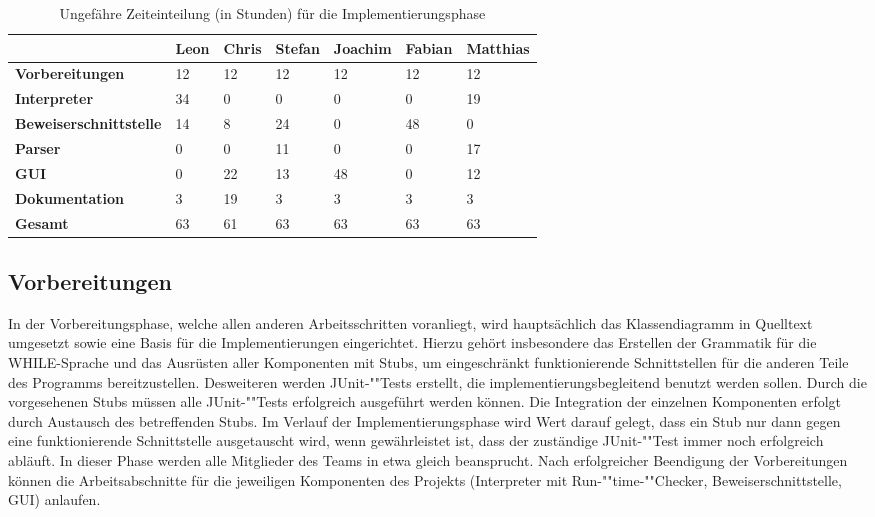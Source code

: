 \begin{figure}
	\label{gantt_impl}
\end{figure}

\begin{table}[H]
	\caption[B]{Ungefähre Zeiteinteilung (in Stunden) für die Implementierungsphase}
	\label{timeplan}
	\begin{tabular}{|l|l|l|l|l|l|l|}
		\hline
		 & \textbf{Leon} & \textbf{Chris} & \textbf{Stefan} & \textbf{Joachim} & \textbf{Fabian} & \textbf{Matthias} \\
		\hline
		\textbf{Vorbereitungen} & 12 & 12 & 12 & 12 & 12 & 12 \\
		\hline
		\textbf{Interpreter} & 34 & 0 & 0 & 0 & 0 & 19 \\
		\hline
		\textbf{Beweiserschnittstelle} & 14 & 8 & 24 & 0 & 48 & 0 \\
		\hline
		\textbf{Parser} & 0 & 0 & 11 & 0 & 0 & 17 \\
		\hline
		\textbf{GUI} & 0 & 22 & 13 & 48 & 0 & 12 \\
		\hline
		\textbf{Dokumentation} & 3 & 19 & 3 & 3 & 3 & 3 \\
		\hline
		\textbf{Gesamt}	& 63 & 61 & 63 & 63 & 63 & 63 \\
		\hline
	\end{tabular}
\end{table}

\subsection{Vorbereitungen}
In der Vorbereitungsphase, welche allen anderen Arbeitsschritten voranliegt, wird hauptsächlich das Klassendiagramm in Quelltext umgesetzt sowie eine Basis für die Implementierungen eingerichtet. Hierzu gehört insbesondere das Erstellen der Grammatik für die WHILE-Sprache und das Ausrüsten aller Komponenten mit Stubs, um eingeschränkt funktionierende Schnittstellen für die anderen Teile des Programms bereitzustellen. Desweiteren werden JUnit-""Tests erstellt, die implementierungsbegleitend benutzt werden sollen. Durch die vorgesehenen Stubs müssen alle JUnit-""Tests erfolgreich ausgeführt werden können. Die Integration der einzelnen Komponenten erfolgt durch Austausch des betreffenden Stubs. Im Verlauf der Implementierungsphase wird Wert darauf gelegt, dass ein Stub nur dann gegen eine funktionierende Schnittstelle ausgetauscht wird, wenn gewährleistet ist, dass der zuständige JUnit-""Test immer noch erfolgreich abläuft. In dieser Phase werden alle Mitglieder des Teams in etwa gleich beansprucht. Nach erfolgreicher Beendigung der Vorbereitungen können die Arbeitsabschnitte für die jeweiligen Komponenten des Projekts (Interpreter mit Run-""time-""Checker, Beweiserschnittstelle, GUI) anlaufen.

